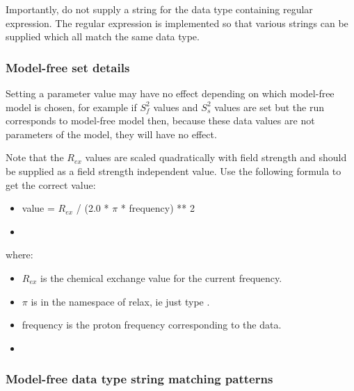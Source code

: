  Importantly, do not supply a string for the data type containing regular expression.  The regular expression is implemented so that various strings can be supplied which all match the same data type. 
  

  
 \subsubsection{Model-free set details} 

 Setting a parameter value may have no effect depending on which model-free model is chosen, for example if $S^2_f$ values and $S^2_s$ values are set but the run corresponds to model-free model  then, because these data values are not parameters of the model, they will have no effect. 
  

 Note that the $R_{ex}$ values are scaled quadratically with field strength and should be supplied as a field strength independent value.  Use the following formula to get the correct value: 
  

 \begin{itemize} 
 \item[] value = $R_{ex}$ / (2.0 * $\pi$ * frequency) ** 2  
 \item[]  
 \end{itemize} 
  

 where: 
  

 \begin{itemize} 
 \item[] $R_{ex}$ is the chemical exchange value for the current frequency.  
 \item[] $\pi$ is in the namespace of relax, ie just type .  
 \item[] frequency is the proton frequency corresponding to the data.  
 \item[]  
 \end{itemize} 
  

  
 \subsubsection{Model-free data type string matching patterns} 

